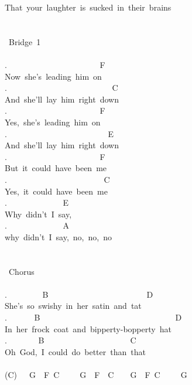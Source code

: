{That\ your\ laughter\ is\ sucked\ in\ their\ brains\\
\\
\\
\lbrack\ Bridge\ 1\rbrack\\
\\
. \ \ \ \ \ \ \ \ \ \ \ \ \ \ \ \ \ \ \ \ \ \ F\\
Now\ she's\ leading\ him\ on\\
. \ \ \ \ \ \ \ \ \ \ \ \ \ \ \ \ \ \ \ \ \ \ \ \ \ C\\
And\ she'll\ lay\ him\ right\ down\\
. \ \ \ \ \ \ \ \ \ \ \ \ \ \ \ \ \ \ \ \ \ \ F\\
Yes,\ she's\ leading\ him\ on\\
. \ \ \ \ \ \ \ \ \ \ \ \ \ \ \ \ \ \ \ \ \ \ \ \ E\\
And\ she'll\ lay\ him\ right\ down\\
. \ \ \ \ \ \ \ \ \ \ \ \ \ \ \ \ \ \ \ \ \ \ F\\
But\ it\ could\ have\ been\ me\\
. \ \ \ \ \ \ \ \ \ \ \ \ \ \ \ \ \ \ \ \ \ \ \ C\\
Yes,\ it\ could\ have\ been\ me\\
. \ \ \ \ \ \ \ \ \ \ \ \ \ E\\
Why\ didn't\ I\ say,\\
. \ \ \ \ \ \ \ \ \ \ \ \ \ A\\
why\ didn't\ I\ say,\ no,\ no,\ no\\
\\
\\
\lbrack\ Chorus\rbrack\\
\\
. \ \ \ \ \ \ \ \ B\ \ \ \ \ \ \ \ \ \ \ \ \ \ \ \ \ \ \ \ \ \ \ \ D\\
She's\ so\ swishy\ in\ her\ satin\ and\ tat\\
. \ \ \ \ \ \ B\ \ \ \ \ \ \ \ \ \ \ \ \ \ \ \ \ \ \ \ \ \ \ \ \ \ \ \ \ \ \ \ \ D\\
In\ her\ frock\ coat\ and\ bipperty-bopperty\ hat\\
. \ \ \ \ \ \ \ B\ \ \ \ \ \ \ \ \ \ \ \ \ \ \ \ \ \ \ \ \ C\\
Oh\ God,\ I\ could\ do\ better\ than\ that\\
\\
(C)\ \ \ G\ \ F\ C\ \ \ \ \ G\ \ F\ \ C\ \ \ \ G\ \ F\ C\ \ \ \ \ G\\
\\
\\
}

